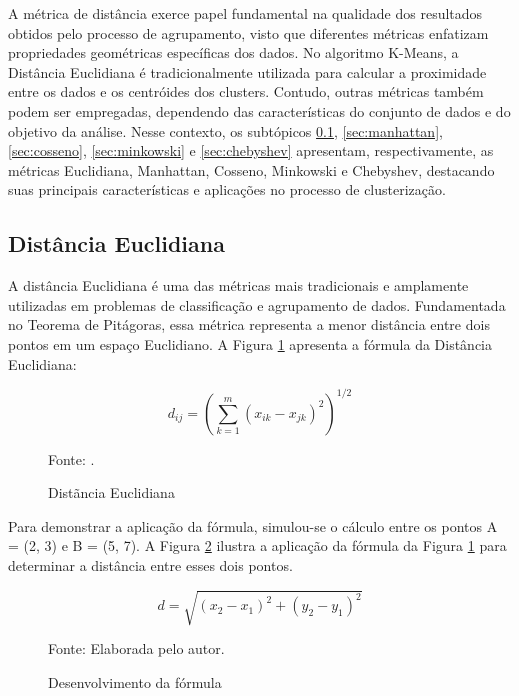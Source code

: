 \documentclass[10pt,a4paper,twocolumn]{article}
\begin{document}
A métrica de distância exerce papel fundamental na qualidade dos resultados obtidos pelo processo de agrupamento, visto que diferentes métricas enfatizam propriedades geométricas específicas dos dados. No algoritmo K-Means, a Distância Euclidiana é tradicionalmente utilizada para calcular a proximidade entre os dados e os centróides dos clusters. Contudo, outras métricas também podem ser empregadas, dependendo das características do conjunto de dados e do objetivo da análise\cite{AlKhamees2026}. Nesse contexto, os subtópicos \ref{sec:euclidiana}, \ref{sec:manhattan}, \ref{sec:cosseno}, \ref{sec:minkowski} e \ref{sec:chebyshev} apresentam, respectivamente, as métricas Euclidiana, Manhattan, Cosseno, Minkowski e Chebyshev, destacando suas principais características e aplicações no processo de clusterização.



\subsection{Distância Euclidiana} %
\label{sec:euclidiana}

A distância Euclidiana é uma das métricas mais tradicionais e amplamente utilizadas em problemas de classificação e agrupamento de dados. Fundamentada no Teorema de Pitágoras, essa métrica representa a menor distância entre dois pontos em um espaço Euclidiano\cite{Rodrigues2018}.
A Figura \ref{fig:euclidiana} apresenta a fórmula da Distância Euclidiana:
\begin{figure}[h!]
   \centering
      \[
         d_{ij} = \left( \sum_{k=1}^{m} (x_{ik} - x_{jk})^2 \right)^{1/2}
      \]
      \vspace{-0.7cm}
       \caption{Distãncia Euclidiana}
       \label{fig:euclidiana}
       \vspace{0.0cm}
       {\small Fonte: \cite{Ferrari2016}.}
\end{figure}

Para demonstrar a aplicação da fórmula, simulou-se o cálculo entre os pontos A = (2, 3) e B = (5, 7). A Figura \ref{fig:euclidianacalc} ilustra a aplicação da fórmula da Figura \ref{fig:euclidiana} para determinar a distância entre esses dois pontos.


\begin{figure}[h!]
   \centering
\[
d = \sqrt{(x_2 - x_1)^2 + (y_2 - y_1)^2}
\]
   \vspace{-0.7cm}
   \caption{Desenvolvimento da fórmula}
   \label{fig:euclidianacalc}
   \vspace{0.0cm}
   {\small Fonte: Elaborada pelo autor.}
\end{figure}
\end{document}

